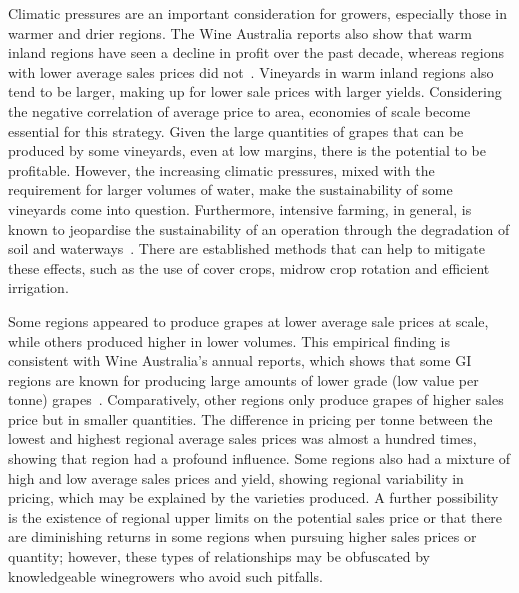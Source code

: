 \documentclass[10pt,letterpaper]{article}
\begin{document}
Climatic pressures are an important consideration for growers, especially those in warmer and drier regions. The Wine Australia reports also show that warm inland regions have seen a decline in profit over the past decade, whereas regions with lower average sales prices did not~\cite{wineaustraliaNationalVintageReport2019,wineaustraliaNationalVintageReport2020,wineaustraliaNationalVintageReport2021,winemakersfederationofaustraliaNationalVintageReport2013,winemakersfederationofaustraliaNationalVintageReport2014,winemakersfederationofaustraliaNationalVintageReport2015,winemakersfederationofaustraliaNationalVintageReport2016,winemakersfederationofaustraliaNationalVintageReport2017,winemakersfederationofaustraliaNationalVintageReport2018}. Vineyards in warm inland regions also tend to be larger, making up for lower sale prices with larger yields. Considering the negative correlation of average price to area, economies of scale become essential for this strategy. Given the large quantities of grapes that can be produced by some vineyards, even at low margins, there is the potential to be profitable. However, the increasing climatic pressures, mixed with the requirement for larger volumes of water, make the sustainability of some vineyards come into question. Furthermore, intensive farming, in general, is known to jeopardise the sustainability of an operation through the degradation of soil and waterways~\cite{capelloEffectsTractorPasses2019,linHydropedologySynergisticIntegration2012,pisciottaGroundwaterNitrateRisk2015}. There are established methods that can help to mitigate these effects, such as the use of cover crops, midrow crop rotation and efficient irrigation.
\par
Some regions appeared to produce grapes at lower average sale prices at scale, while others produced higher in lower volumes. This empirical finding is consistent with Wine Australia's annual reports, which shows that some GI regions are known for producing large amounts of lower grade (low value per tonne) grapes~\cite{wineaustraliaNationalVintageReport2022,winemakersfederationofaustraliaNationalVintageReport2017}. Comparatively, other regions only produce grapes of higher sales price but in smaller quantities. The difference in pricing per tonne between the lowest and highest regional average sales prices was almost a hundred times, showing that region had a profound influence. Some regions also had a mixture of high and low average sales prices and yield, showing regional variability in pricing, which may be explained by the varieties produced. A further possibility is the existence of regional upper limits on the potential sales price or that there are diminishing returns in some regions when pursuing higher sales prices or quantity; however, these types of relationships may be obfuscated by knowledgeable winegrowers who avoid such pitfalls.
\end{document}
